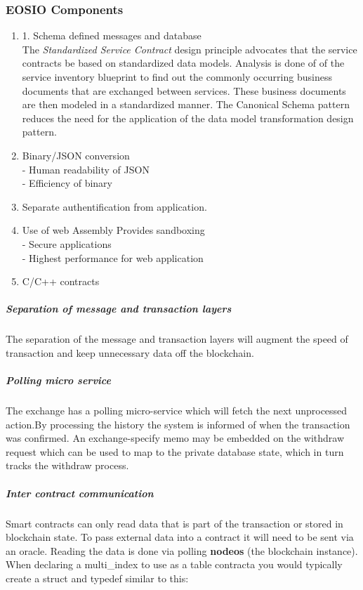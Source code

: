 \documentclass[]{article}
\begin{document}
	
  \subsubsection{EOSIO Components}
		\begin{enumerate}
			\item 1. Schema defined messages and database \\
			The \textit{Standardized Service Contract} design principle advocates that the service contracts be based on standardized data models. Analysis is done of of the service inventory blueprint to find out the commonly occurring business documents that are exchanged between services. These business documents are then modeled in a standardized manner. The Canonical Schema pattern reduces the need for the application of the data model transformation design pattern.			
	
		\item Binary/JSON conversion \\
		- Human readability of JSON \\
		- Efficiency of binary \\
	
		\item Separate authentification from application.
	
	\item Use of web Assembly Provides sandboxing   \\
	- Secure applications \\
	- Highest performance for web application\\
	
	\item C/C++ contracts
		
\end{enumerate}
	 
	\subparagraph{	Separation of message and  transaction layers }
	The separation of the message and transaction layers will augment 
	the speed of transaction and keep unnecessary data off the blockchain. 
		
	\subparagraph{Polling micro service}
	The exchange has a polling micro-service which will fetch the next 
	unprocessed action.By processing the history the system is informed of when the transaction was confirmed. 
	An exchange-specify memo may be embedded on the withdraw request which can be used to map to the private database state, which in turn tracks the withdraw process.
	

	\subparagraph{Inter contract communication}
	Smart contracts can only read data that is part of the transaction or stored in blockchain state. To pass external data into a contract it will need to be sent via an oracle. Reading the data is done via polling \textbf{nodeos} (the blockchain instance).
	When declaring a multi\_index to use as a table contracta you would typically create a struct and typedef similar to this:\\
	
\end{document}
